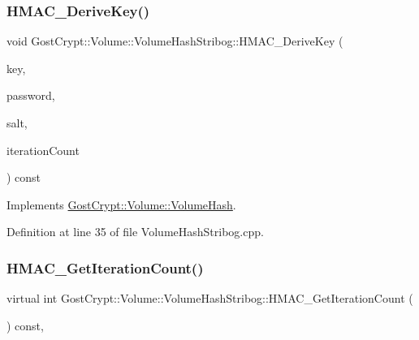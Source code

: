 \subsubsection{\texorpdfstring{H\+M\+A\+C\+\_\+\+Derive\+Key()}{HMAC\_DeriveKey()}}
{\footnotesize\ttfamily void Gost\+Crypt\+::\+Volume\+::\+Volume\+Hash\+Stribog\+::\+H\+M\+A\+C\+\_\+\+Derive\+Key (\begin{DoxyParamCaption}\item[{const \hyperlink{class_gost_crypt_1_1_buffer_ptr}{Buffer\+Ptr} \&}]{key,  }\item[{const \hyperlink{class_gost_crypt_1_1_volume_1_1_volume_password}{Volume\+Password} \&}]{password,  }\item[{const \hyperlink{class_gost_crypt_1_1_buffer_ptr}{Buffer\+Ptr} \&}]{salt,  }\item[{int}]{iteration\+Count }\end{DoxyParamCaption}) const\hspace{0.3cm}{\ttfamily [virtual]}}



Implements \hyperlink{class_gost_crypt_1_1_volume_1_1_volume_hash_a6804d6896491ea8c0a7be6600b6d7113}{Gost\+Crypt\+::\+Volume\+::\+Volume\+Hash}.



Definition at line 35 of file Volume\+Hash\+Stribog.\+cpp.

\mbox{\label{class_gost_crypt_1_1_volume_1_1_volume_hash_stribog_a7c3a5d51633b91a39d58edd4376a6199}} 
\subsubsection{\texorpdfstring{H\+M\+A\+C\+\_\+\+Get\+Iteration\+Count()}{HMAC\_GetIterationCount()}}
{\footnotesize\ttfamily virtual int Gost\+Crypt\+::\+Volume\+::\+Volume\+Hash\+Stribog\+::\+H\+M\+A\+C\+\_\+\+Get\+Iteration\+Count (\begin{DoxyParamCaption}{ }\end{DoxyParamCaption}) const\hspace{0.3cm}{\ttfamily [inline]}, {\ttfamily [virtual]}}




